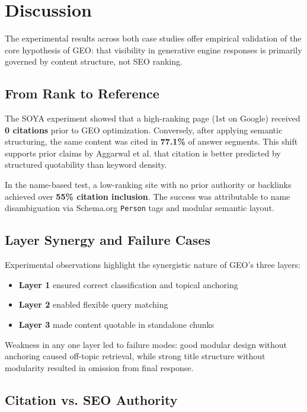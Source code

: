 \section{Discussion}

The experimental results across both case studies offer empirical validation of the core hypothesis of GEO: that visibility in generative engine responses is primarily governed by content structure, not SEO ranking.

\subsection{From Rank to Reference}

The SOYA experiment showed that a high-ranking page (1st on Google) received \textbf{0 citations} prior to GEO optimization. Conversely, after applying semantic structuring, the same content was cited in \textbf{77.1\%} of answer segments. This shift supports prior claims by Aggarwal et al. \cite{aggarwal2024geo} that citation is better predicted by structured quotability than keyword density.

In the name-based test, a low-ranking site with no prior authority or backlinks achieved over \textbf{55\% citation inclusion}. The success was attributable to name disambiguation via Schema.org \texttt{Person} tags and modular semantic layout.

\subsection{Layer Synergy and Failure Cases}

Experimental observations highlight the synergistic nature of GEO's three layers:
\begin{itemize}
  \item \textbf{Layer 1} ensured correct classification and topical anchoring
  \item \textbf{Layer 2} enabled flexible query matching
  \item \textbf{Layer 3} made content quotable in standalone chunks
\end{itemize}
Weakness in any one layer led to failure modes: good modular design without anchoring caused off-topic retrieval, while strong title structure without modularity resulted in omission from final response.

\subsection{Citation vs. SEO Authority}


